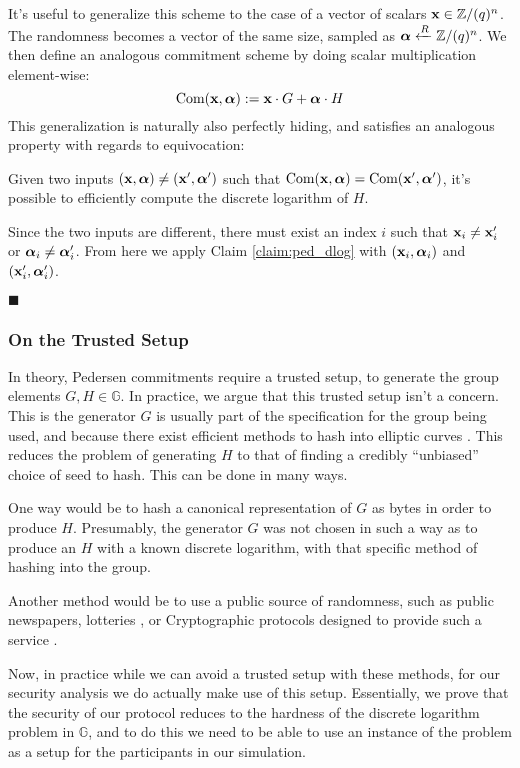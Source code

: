 It's useful to generalize this scheme to the case of a vector of scalars
${\textbf{x} \in \mathbb{Z}/(q)^n}$. The randomness becomes a vector of the same
size, sampled as ${\boldsymbol{\alpha} \xleftarrow{R} \mathbb{Z}/(q)^n}$. We then define
an analogous commitment scheme by doing scalar multiplication element-wise:
$$
\text{Com}(\textbf{x}, \boldsymbol{\alpha}) := \textbf{x} \cdot G + \boldsymbol{\alpha} \cdot H
$$
This generalization is naturally also perfectly hiding, and satisfies
an analogous property with regards to equivocation:

\begin{claim}
    \label{claim:ped_vec_dlog}
    Given two inputs $(\textbf{x}, \boldsymbol{\alpha}) \neq (\textbf{x}', \boldsymbol{\alpha}')$ such that
    $\text{Com}(\textbf{x}, \boldsymbol{\alpha}) = \text{Com}(\textbf{x}', \boldsymbol{\alpha}')$, it's possible
    to efficiently compute the discrete logarithm of $H$.
\end{claim}

Since the two inputs are different, there must exist an index $i$
such that $\textbf{x}_i \neq \textbf{x}_i'$ or $\boldsymbol{\alpha}_i \neq \boldsymbol{\alpha}_i'$.
From here we apply Claim \ref{claim:ped_dlog} with $(\textbf{x}_i, \boldsymbol{\alpha}_i)$ and
$(\textbf{x}_i', \boldsymbol{\alpha}'_i)$.

$\blacksquare$

\subsubsection{On the Trusted Setup}

In theory, Pedersen commitments require a trusted setup, to generate
the group elements $G, H \in \mathbb{G}$. In practice, we argue that
this trusted setup isn't a concern. This is the generator $G$
is usually part of the specification for the group being used,
and because there exist
efficient methods to hash into elliptic curves \cite{icart_how_2009}.
This reduces the problem of generating $H$ to that of finding a credibly
``unbiased'' choice of seed to hash. This can be done in many ways.

One way would be to hash a canonical representation of $G$ as bytes in order
to produce $H$. Presumably, the generator $G$ was not chosen in such
a way as to produce an $H$ with a known discrete logarithm, with
that specific method of hashing into the group.

Another method would be to use a public source of randomness,
such as public newspapers, lotteries
\cite{baigneres_trap_2015}, or Cryptographic protocols
designed to provide such a service \cite{fischer_public_2011}.

Now, in practice while we can avoid a trusted setup with these methods,
for our security analysis we do actually make use of this setup.
Essentially, we prove that the security of our protocol reduces
to the hardness of the discrete logarithm problem in $\mathbb{G}$,
and to do this we need to be able to use an instance of the problem
as a setup for the participants in our simulation.

